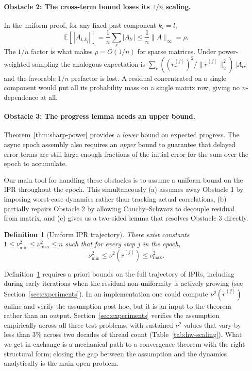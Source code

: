 \documentclass[pdflatex,sn-mathphys-num]{sn-jnl}%
\newcommand{\E}{\mathbb{E}}
\theoremstyle{thmstyleone}%
\theoremstyle{thmstyletwo}%
\theoremstyle{thmstylethree}%
\newtheorem{definition}{Definition}%
\begin{document}
\paragraph{Obstacle 2: The cross-term bound loses its $1/n$ scaling.} In the uniform proof, for any fixed past component $k_t = l$,
$$
\E[\,|A_{l, k_j}|\,] = \frac{1}{n}\sum_r |A_{lr}| \leq \frac{1}{n}\|A\|_\infty = \rho.
$$
The $1/n$ factor is what makes $\rho = O(1/n)$ for sparse matrices. Under power-weighted sampling the analogous expectation is $\sum_r ((\tilde r_r^{(j)})^2/\|\tilde r^{(j)}\|_2^2)\, |A_{lr}|$ and the favorable $1/n$ prefactor is lost. A residual concentrated on a single component would put all its probability mass on a single matrix row, giving no $n$-dependence at all.

\paragraph{Obstacle 3: The progress lemma needs an upper bound.} Theorem~\ref{thm:sharp-power} provides a \emph{lower} bound on expected progress. The async epoch assembly also requires an \emph{upper} bound to guarantee that delayed error terms are still large enough fractions of the initial error for the sum over the epoch to accumulate.

\vspace{1em}

Our main tool for handling these obstacles is to assume a uniform bound on the IPR throughout the epoch. This simultaneously (a) assumes away Obstacle 1 by imposing worst-case dynamics rather than tracking actual correlations, (b) partially repairs Obstacle 2 by allowing Cauchy--Schwarz to decouple residual from matrix, and (c) gives us a two-sided lemma that resolves Obstacle 3 directly.

\begin{definition}[Uniform IPR trajectory]
\label{assump:global-ipr}
There exist constants $1 \leq \nu_{\min}^2 \leq \nu_{\max}^2 \leq n$ such that for every step $j$ in the epoch,
$$
\nu_{\min}^2 \leq \nu^2(\tilde r^{(j)}) \leq \nu_{\max}^2.
$$
\end{definition}

Definition~\ref{assump:global-ipr} requires a priori bounds on the full
trajectory of IPRs, including during early iterations when the
residual non-uniformity is actively growing (see
Section~\ref{sec:experiments}). In an implementation one could compute
$\nu^2(\tilde r^{(j)})$ online and verify the assumption post hoc, but
it is an input to the theorem rather than an output.
Section~\ref{sec:experiments} verifies the assumption empirically
across all three test problems, with sustained $\nu^2$ values that
vary by less than $3\%$ across two decades of thread count
(Table~\ref{tab:hw-scaling}). What we get in exchange is a mechanical
path to a convergence theorem with the right structural form; closing
the gap between the assumption and the dynamics analytically is the
main open problem.
\end{document}
